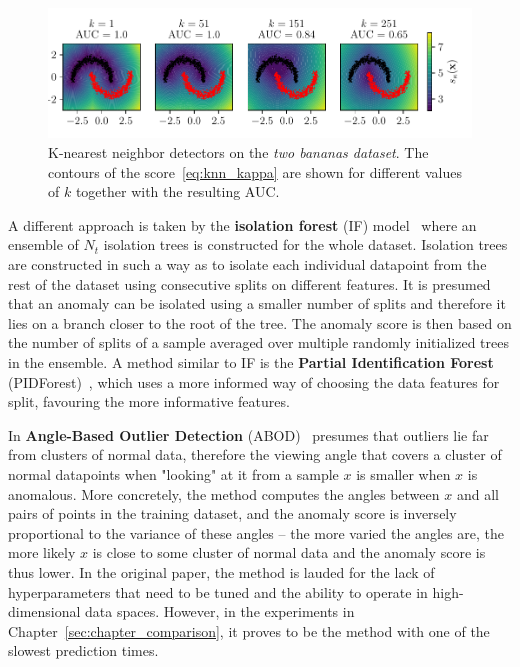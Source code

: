 \begin{figure}
\begin{centering}
\includegraphics[scale=0.98]{data/chapter_intro/knn_examples.pdf}
\end{centering}
\caption{K-nearest neighbor detectors on the \textit{two bananas dataset}. The contours of the score~\eqref{eq:knn_kappa} are shown for different values of $k$ together with the resulting AUC.}
\label{fig:knn_examples}
\end{figure}

A different approach is taken by the \textbf{isolation forest }(IF) model~\cite{liu2008isolation} where an ensemble of $N_t$ isolation trees is constructed for the whole dataset. Isolation trees are constructed in such a way as to isolate each individual datapoint from the rest of the dataset using consecutive splits on different features. It is presumed that an anomaly can be isolated using a smaller number of splits and therefore it lies on a branch closer to the root of the tree. The anomaly score is then based on the number of splits of a sample averaged over multiple randomly initialized trees in the ensemble. A method similar to IF is the \textbf{Partial Identification Forest} (PIDForest)~\cite{gopalanPIDForestAnomalyDetection2019}, which uses a more informed way of choosing the data features for split, favouring the more informative features.

In \textbf{Angle-Based Outlier Detection} (ABOD)~\cite{kriegel2008angle} presumes that outliers lie far from clusters of normal data, therefore the viewing angle that covers a cluster of normal datapoints when "looking" at it from a sample $x$ is smaller when $x$ is anomalous. More concretely, the method computes the angles between $x$ and all pairs of points in the training dataset, and the anomaly score is inversely proportional to the variance of these angles -- the more varied the angles are, the more likely $x$ is close to some cluster of normal data and the anomaly score is thus lower. In the original paper, the method is lauded for the lack of hyperparameters that need to be tuned and the ability to operate in high-dimensional data spaces. However, in the experiments in Chapter~\ref{sec:chapter_comparison}, it proves to be the method with one of the slowest prediction times.

